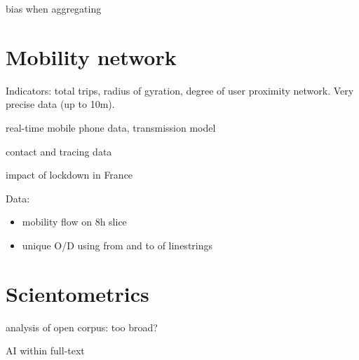 \documentclass[10pt]{article}
\begin{document}
\cite{2020arXiv200412994B} bias when aggregating


	
\section{Mobility network}
	
\cite{Pepe2020.03.22.20039933} Indicators: total trips, radius of gyration, degree of user proximity network. Very precise data (up to 10m).




\cite{jia2020population} real-time mobile phone data, transmission model

\cite{Zhangeabb8001} contact and tracing data


\cite{salje:pasteur-02548181} impact of lockdown in France
	
Data:

\begin{itemize}
	\item mobility flow on 8h slice
	\item unique O/D using from and to of linestrings
\end{itemize}





\section{Scientometrics}

\cite{Colavizza2020.04.20.046144} analysis of open corpus: too broad?

\cite{khamsi2020coronavirus} AI within full-text

	
	
	
	


	
	
\end{document}
